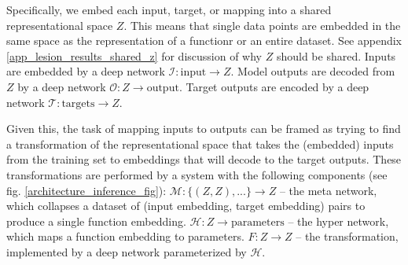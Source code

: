 \documentclass{article}
\begin{document}
Specifically, we embed each input, target, or mapping into a shared representational space $Z$. This means that single data points are embedded in the same space as the representation of a functionr or an entire dataset. See appendix \ref{app_lesion_results_shared_z} for discussion of why $Z$ should be shared. Inputs are embedded by a deep network $\mathcal{I}: \text{input} \rightarrow Z$. Model outputs are decoded from $Z$ by a deep network $\mathcal{O}: Z \rightarrow \text{output}$. Target outputs are encoded by a deep network $\mathcal{T}: \text{targets} \rightarrow Z$.\par
Given this, the task of mapping inputs to outputs can be framed as trying to find a transformation of the representational space that takes the (embedded) inputs from the training set to embeddings that will decode to the target outputs. These transformations are performed by a system with the following components (see fig. \ref{architecture_inference_fig}): $\mathcal{M}: \{(Z, Z), ...\} \rightarrow Z $ -- the meta network, which collapses a dataset of (input embedding, target embedding) pairs to produce a single function embedding. $\mathcal{H}: Z \rightarrow \text{parameters}$ -- the hyper network, which maps a function embedding to parameters. $F: Z \rightarrow Z$ -- the transformation, implemented by a deep network parameterized by $\mathcal{H}$. \par
\vspace{-0.5em}
\end{document}
